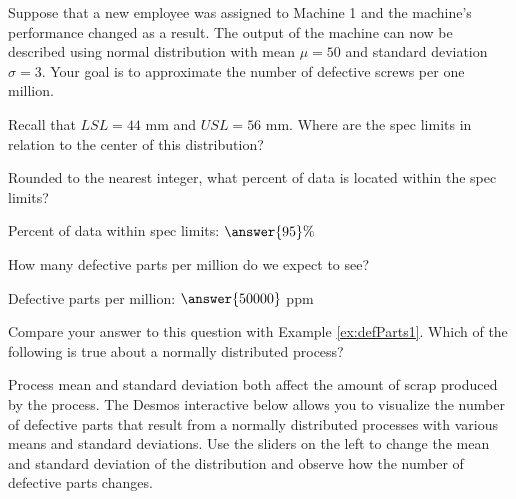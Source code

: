 \documentclass{ximera}
\begin{document}
\begin{question}\label{quest:defParts1}
    Suppose that a new employee was assigned to Machine 1 and the machine's performance changed as a result.   The output of the machine can now be described using normal distribution with mean $\mu=50$ and standard deviation $\sigma=3$.  Your goal is to approximate the number of defective screws per one million.

    Recall that $LSL=44$ mm and $USL=56$ mm. Where are the spec limits in relation to the center of this distribution?

    \begin{multipleChoice}
    \end{multipleChoice}

Rounded to the nearest integer, what percent of data is located within the spec limits?

Percent of data within spec limits: $\answer{95}\%$

How many defective parts per million do we expect to see?  

Defective parts per million: $\answer{50000}$ ppm

Compare your answer to this question with Example \ref{ex:defParts1}.  Which of the following is true about a normally distributed process?

\begin{multipleChoice}
    \end{multipleChoice}
    \end{question}

Process mean and standard deviation both affect the amount of scrap produced by the process.  The Desmos interactive below allows you to visualize the number of defective parts that result from a normally distributed processes with various means and standard deviations.  Use the sliders on the left to change the mean and standard deviation of the distribution and observe how the number of defective parts changes.

\begin{onlineOnly}
\begin{center} 
\end{center}
\end{onlineOnly}
\end{document}

